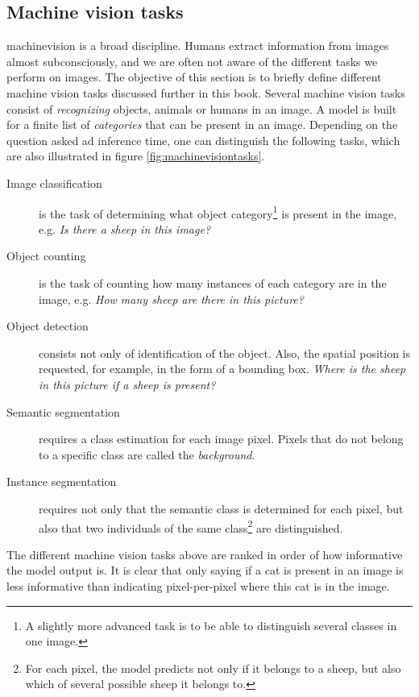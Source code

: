 \subsection{Machine vision tasks \label{sec:machinevisiontasks}}
\par{
    \Gls{machinevision} is a broad discipline. 
    Humans extract information from images almost subconsciously, and we are often not aware of the different tasks we perform on images.
    The objective of this section is to briefly define different machine vision tasks discussed further in this book. 
    Several machine vision tasks consist of \textit{recognizing} objects, animals or humans in an image.
    A model is built for a finite list of \textit{categories} that can be present in an image.
    Depending on the question asked ad inference time, one can distinguish the following tasks, which are also illustrated in figure \ref{fig:machinevisiontasks}.
}
\begin{description}
    \item[Image classification] is the task of determining what object category\footnote{A slightly more advanced task is to be able to distinguish several classes in one image.} is present in the image, e.g. \textit{Is there a sheep in this image?}
    \item[Object counting] is the task of counting how many instances of each category are in the image, e.g. \textit{How many sheep are there in this picture?} 
    \item[Object detection] consists not only of identification of the object. Also, the spatial position is requested, for example, in the form of a bounding box. \textit{Where is the sheep in this picture if a sheep is present?}
    \item[Semantic segmentation] requires a class estimation for each image pixel. Pixels that do not belong to a specific class are called the \textit{background}.
    \item[Instance segmentation] requires not only that the semantic class is determined for each pixel, but also that two individuals of the same class\footnote{For each pixel, the model predicts not only if it belongs to a sheep, but also which of several possible sheep it belongs to.} are distinguished.   
\end{description}
\par{
    The different machine vision tasks above are ranked in order of how informative the model output is.
    It is clear that only saying if a cat is present in an image is less informative than indicating pixel-per-pixel where this cat is in the image.
}
